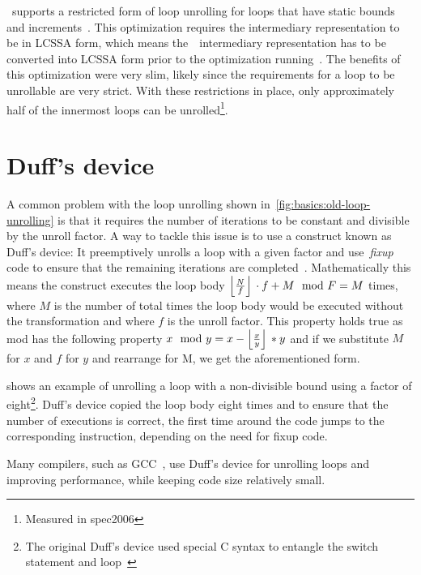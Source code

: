 \libFIRM~supports a restricted form of loop unrolling for loops that have static bounds and increments~\cite{aebi18bachelorarbeit}.
This optimization requires the intermediary representation to be in LCSSA form, which means the~\libFIRM~intermediary representation has to be converted into LCSSA form prior to the optimization running~\cite{aebi18bachelorarbeit}.
The benefits of this optimization were very slim, likely since the requirements for a loop to be unrollable are very strict.
With these restrictions in place, only approximately half of the innermost loops can be unrolled\footnote{Measured in spec2006}.




\section{Duff's device}\label{sec:basics:duffs}

A common problem with the loop unrolling shown in~\cref{fig:basics:old-loop-unrolling} is that it requires the number of iterations to be constant and divisible by the unroll factor.
A way to tackle this issue is to use a construct known as Duff's device: It preemptively unrolls a loop with a given factor and use~\textit{fixup} code to ensure that the remaining iterations are completed~\cite{duff_1983}.
Mathematically this means the construct executes the loop body $\left\lfloor{}\frac{N}{f}\right\rfloor{} \cdot f + M \mod F = M$ times, where $M$ is the number of total times the loop body would be executed without the transformation and where $f$ is the unroll factor.
This property holds true as mod has the following property $x \mod y = x - \left\lfloor{}\frac{x}{y}\right\rfloor{} * y$ and if we substitute $M$ for $x$ and $f$ for $y$ and rearrange for M, we get the aforementioned form.

 shows an example of unrolling a loop with a non-divisible bound using a factor of eight\footnote{The original Duff's device used special C syntax to entangle the switch statement and loop~\cite{duff_1983}}.
Duff's device copied the loop body eight times and to ensure that the number of executions is correct, the first time around the code jumps to the corresponding instruction, depending on the need for fixup code.

Many compilers, such as GCC~\cite{gcc}, use Duff's device for unrolling loops and improving performance, while keeping code size relatively small.



